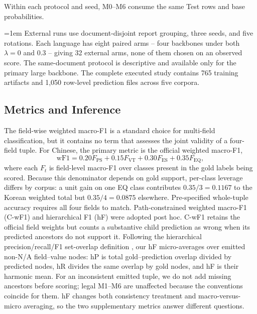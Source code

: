 Within each protocol and seed, M0--M6 consume the same Test rows and base
probabilities.

\begingroup\emergencystretch=1em
External runs use document-disjoint report grouping, three seeds, and five
rotations. Each language has eight paired arms -- four backbones under both
$\lambda=0$ and 0.3 -- giving 32 external arms, none of them chosen on an
observed score. The same-document protocol is descriptive and available only
for the primary large backbone. The complete executed study contains 765
training artifacts and 1,050 row-level prediction files across five corpora.
\par\endgroup

\subsection{Metrics and Inference}
\label{sec:metrics}
The field-wise weighted macro-F1 is a standard choice for multi-field
classification, but it contains no term that assesses the joint validity of a
four-field tuple. For Chinese, the primary metric is the official weighted
macro-F1,
\begin{equation}
  \mathrm{wF1}=0.20F_{\mathrm{PS}}+0.15F_{\mathrm{VT}}
  +0.30F_{\mathrm{ES}}+0.35F_{\mathrm{EQ}},
  \label{eq:official-metric}
\end{equation}
where each $F_t$ is field-level macro-F1 over classes present in the gold
labels being scored. Because this denominator depends on gold support,
per-class leverage differs by corpus: a unit gain on one EQ class contributes
$0.35/3=0.1167$ to the Korean weighted total but $0.35/4=0.0875$ elsewhere.
Pre-specified whole-tuple accuracy requires all four fields to match.
Path-constrained weighted macro-F1 (C-wF1) and
hierarchical F1 (hF) were adopted post hoc. C-wF1 retains the official field
weights but counts a substantive child prediction as wrong when its predicted
ancestors do not support it. Following the hierarchical precision/recall/F1
set-overlap definition \cite{plaud2024revisiting}, our hF micro-averages over
emitted non-N/A field--value nodes: hP is total gold--prediction overlap divided
by predicted nodes, hR divides the same overlap by gold nodes, and hF is their
harmonic mean. For an inconsistent emitted tuple, we do not add missing
ancestors before scoring; legal M1--M6 are unaffected because the conventions
coincide for them. hF changes both consistency treatment and macro-versus-micro
averaging, so the two supplementary metrics answer different questions.

